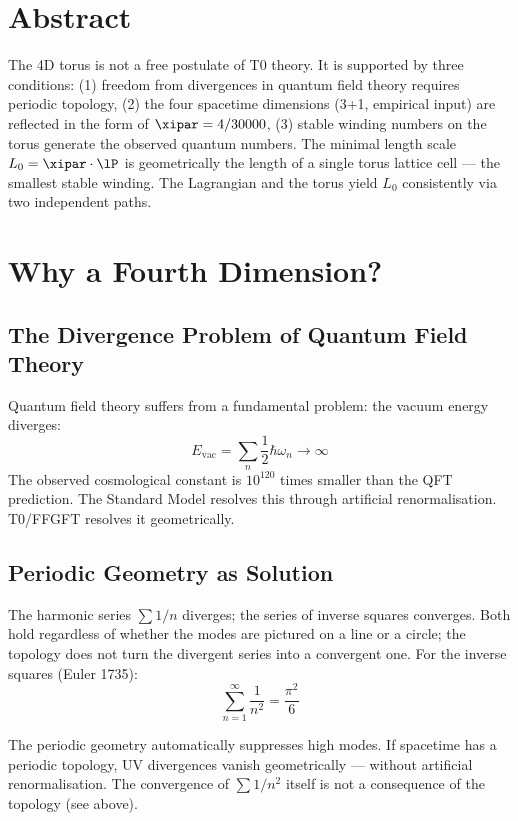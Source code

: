 \section*{Abstract}

The 4D torus is not a free postulate of T0 theory. It is supported by three conditions: (1) freedom from divergences in quantum field theory requires periodic topology, (2) the four spacetime dimensions (3+1, empirical input) are reflected in the form of $\xipar = 4/30000$, (3) stable winding numbers on the torus generate the observed quantum numbers. The minimal length scale $L_0 = \xipar \cdot \lP$ is geometrically the length of a single torus lattice cell — the smallest stable winding. The Lagrangian and the torus yield $L_0$ consistently via two independent paths.

\section{Why a Fourth Dimension?}

\subsection{The Divergence Problem of Quantum Field Theory}

Quantum field theory suffers from a fundamental problem: the vacuum energy diverges:
\begin{equation}
	E_{\text{vac}} = \sum_n \frac{1}{2}\hbar\omega_n \rightarrow \infty
\end{equation}
The observed cosmological constant is $10^{120}$ times smaller than the QFT prediction. The Standard Model resolves this through artificial renormalisation. T0/FFGFT resolves it geometrically.

\subsection{Periodic Geometry as Solution}

The harmonic series $\sum 1/n$ diverges; the series of inverse squares converges. Both hold regardless of whether the modes are pictured on a line or a circle; the topology does not turn the divergent series into a convergent one. For the inverse squares (Euler 1735):
\begin{equation}
	\sum_{n=1}^{\infty} \frac{1}{n^2} = \frac{\pi^2}{6}
\end{equation}

\begin{keypoint}
The periodic geometry automatically suppresses high modes. If spacetime has a periodic topology, UV divergences vanish geometrically — without artificial renormalisation. The convergence of $\sum 1/n^2$ itself is not a consequence of the topology (see above).
\end{keypoint}

